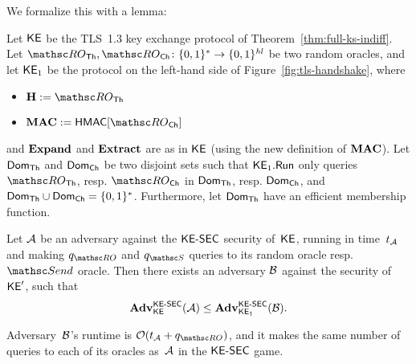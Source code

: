 We formalize this with a lemma:
\begin{lemma}%
	
	\label{thm:ks-indiff-hop-1-comp}
	Let $\mathsf{KE}$ be the TLS~1.3 key exchange protocol of Theorem~\ref{thm:full-ks-indiff}.
	Let $\ROthash, \ROchash\colon\allowbreak \bits^* \to \bits^{\hashlen}$ be two random oracles, and
	let  $\mathsf{KE}_1$ be the protocol on the left-hand side of Figure~\ref{fig:tls-handshake}, where
	\begin{itemize}
		\item $\abstractHash := \ROthash$
		\item $\abstractMAC := \HMAC[\ROchash]$
	\end{itemize}
	and $\mathbf{Expand}$ and $\mathbf{Extract}$ are as in $\mathsf{KE}$ (using the new definition of $\mathbf{MAC}$).
	Let $\mathsf{Dom}_{\mathsf{Th}}$ and $\mathsf{Dom}_{\mathsf{Ch}}$ be two disjoint sets such that $\mathsf{KE}_1.\mathsf{Run}$ only queries $\ROthash$, resp. $\ROchash$ in $\mathsf{Dom}_{\mathsf{Th}}$, resp. $\mathsf{Dom}_{\mathsf{Ch}}$, and $\mathsf{Dom}_{\mathsf{Th}}\cup \mathsf{Dom}_{\mathsf{Ch}} = \{0,1\}^*$.
	Furthermore, let $\mathsf{Dom}_{\mathsf{Th}}$ have an efficient membership function.	
	
	Let $\mathcal{A}$ be an adversary against the $\mathsf{KE{\text{\normalfont-}}SEC}$ security of~$\mathsf{KE}$, running in time~$t_{\mathcal{A}}$ and making $\qRO$ and $\qSend$ queries to its random oracle resp.\ $\Send$ oracle.
	Then there exists an adversary $\mathcal{B}$ against the security of $\mathsf{KE}'$, such that 
	\[
	\mathbf{Adv}^{\mathrm{\mathsf{KE{\text{\normalfont-}}SEC}}}_{\mathsf{KE}}(\mathcal{A})
	\leq \mathbf{Adv}^{\mathrm{\mathsf{KE{\text{\normalfont-}}SEC}}}_{\mathsf{KE}_1}(\mathcal{B}).
	\]
	
	Adversary~$\mathcal{B}$'s runtime is $\bigO(t_{\advA} + \qRO)$, and it makes the same number of queries to each of its oracles as~$\mathcal{A}$ in the $\mathsf{KE{\text{\normalfont-}}SEC}$ game. 
\end{lemma}
